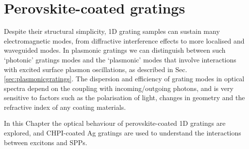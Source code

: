 
\chapter{Perovskite-coated gratings}

\graphicspath{{Chapter7/Figures/}}

Despite their structural simplicity, 1D grating samples can sustain many electromagnetic modes, from diffractive interference effects to more localised and waveguided modes. In plasmonic gratings we can distinguish between such `photonic' gratings modes and the `plasmonic' modes that involve interactions with excited surface plasmon oscillations, as described in Sec.\,\ref{sec:plasmonicgratings}. The dispersion and efficiency of grating modes in optical spectra depend on the coupling with incoming/outgoing photons, and is very sensitive to factors such as the polarisation of light, changes in geometry and the refractive index of any coating materials.

In this Chapter the optical behaviour of perovskite-coated 1D gratings are explored, and CHPI-coated Ag gratings are used to understand the interactions between excitons and SPPs.

